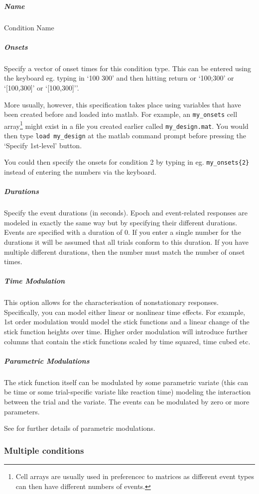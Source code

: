 \documentclass[a4paper,titlepage]{book}
\begin{document}
\subparagraph{Name}
Condition Name


\subparagraph{Onsets}
Specify a vector of onset times for this condition type. 
This can be entered using the keyboard eg. typing in 
`100 300' and then hitting return or `100;300' or 
`[100,300]' or `[100,300]''.

More usually, however, this specification takes place 
using variables that have been created before and loaded into matlab. For example, an \verb!my_onsets! cell array\footnote{Cell arrays are usually used in preferencec to matrices as different event types can then have different numbers of events.} might 
exist in a file you created earlier called \verb!my_design.mat!. You would then type 
\verb!load my_design! at the matlab command prompt before pressing the `Specify 1st-level' button. 

You could then specify the onsets for condition 2 by typing in eg. \verb!my_onsets{2}! instead of entering 
the numbers via the keyboard.
 

\subparagraph{Durations}
Specify the event durations (in seconds). Epoch and event-related responses are modeled in exactly the same way but by specifying their different durations.  Events are specified with a duration of 0.  If you enter a single number for the durations it will be assumed that all trials conform to this duration. If you have multiple different durations, then the number must match the number of onset times.


\subparagraph{Time Modulation}
This option allows for the characterisation of nonstationary responses.  Specifically, you can model either linear or nonlinear time effects. For example, 1st order modulation would model the stick functions and a linear change of the stick function heights over time. Higher order modulation will introduce further columns that contain the stick functions scaled by time squared, time cubed etc.

\subparagraph{Parametric Modulations}
The stick function itself can be modulated by some parametric variate (this can be time or some trial-specific variate like reaction time) modeling the interaction between the trial and the variate. The events can be modulated by zero or more parameters.

See \cite{parametric_pet,parametric_fmri} for further details of 
parametric modulations.

\subsubsection{Multiple conditions}
\end{document}
